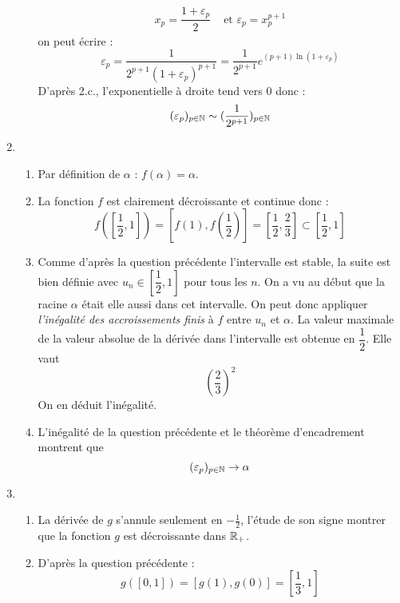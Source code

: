 \begin{enumerate}
\begin{enumerate}
\begin{align*}
 x_p=\dfrac{1+\varepsilon_p}{2} &\text{ et } \varepsilon_p = x_p^{p+1}
\end{align*}
on peut écrire :
\begin{displaymath}
 \varepsilon_p = \dfrac{1}{2^{p+1} (1+\varepsilon_p)^{p+1}} = \dfrac{1}{2^{p+1}}e^{(p+1)\ln (1+\varepsilon_p)}
\end{displaymath}
D'après 2.c., l'exponentielle à droite tend vers $0$ donc :
\begin{displaymath}
 (\varepsilon_p)_{p\in\mathbb{N}} \sim (\dfrac{1}{2^{p+1}})_{p\in\mathbb{N}}
\end{displaymath}
\end{enumerate}
\item \begin{enumerate}
 \item Par définition de $\alpha$ : $f(\alpha)=\alpha$.
\item La fonction $f$ est clairement décroissante et continue donc :
\begin{displaymath}
 f([\dfrac{1}{2},1]) = [f(1),f(\dfrac{1}{2})]=[\dfrac{1}{2},\dfrac{2}{3}]\subset [\dfrac{1}{2},1]
\end{displaymath}
\item Comme d'après la question précédente l'intervalle est stable, la suite est bien définie avec $u_n\in [\dfrac{1}{2},1]$ pour tous les $n$. On a vu au début que la racine $\alpha$ était elle aussi dans cet intervalle. On peut donc appliquer \emph{l'inégalité des accroissements finis} à $f$ entre $u_n$ et $\alpha$. La valeur maximale de la valeur absolue de la dérivée dans l'intervalle est obtenue en $\dfrac{1}{2}$. Elle vaut 
\begin{displaymath}
 (\dfrac{2}{3})^2
\end{displaymath}
On en déduit l'inégalité.
\item L'inégalité de la question précédente et le théorème d'encadrement montrent que
\begin{displaymath}
 (\varepsilon_p)_{p\in\mathbb{N}} \rightarrow \alpha
\end{displaymath}
\end{enumerate}
\item \begin{enumerate}
 \item La dérivée de $g$ s'annule seulement en $-\frac{1}{2}$, l'étude de son signe montrer que la fonction $g$ est décroissante dans $\mathbb{R}_+$.
\item D'après la question précédente :
\begin{displaymath}
 g([0,1])=[g(1),g(0)]=[\dfrac{1}{3},1]

\end{displaymath}
\end{enumerate}
\end{enumerate}
